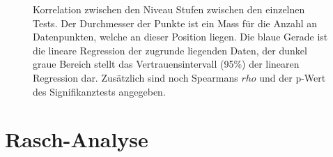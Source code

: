\begin{figure}[htbp]
\caption{Korrelation zwischen den Niveau Stufen zwischen den einzelnen Tests. Der Durchmesser der Punkte ist ein Mass für die Anzahl an Datenpunkten, welche an dieser Position liegen. Die blaue Gerade ist die lineare Regression der zugrunde liegenden Daten, der dunkel graue Bereich stellt das Vertrauensintervall (95\%) der linearen Regression dar. Zusätzlich sind noch Spearmans $rho$ und der p-Wert des Signifikanztests angegeben.}
\label{fig:corLev}
\end{figure}



\section{Rasch-Analyse}
